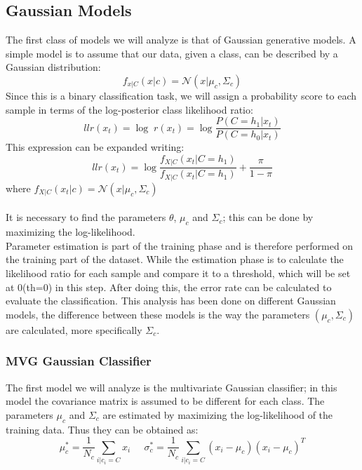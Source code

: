 \documentclass{article}
\begin{document}
\subsection{Gaussian Models}
The first class of models we will analyze is that of Gaussian generative models. A simple model is to assume that our data, given a class, can be described by a Gaussian distribution:
\begin{equation}
    f_{x|C}(x|c) = \mathcal{N}(x|\mu_c,\Sigma_c)
\end{equation}
Since this is a binary classification task, we will assign a probability score to each sample in terms of the log-posterior class likelihood ratio:
\begin{equation}
    llr(x_t) = \log \;r(x_t) = \log \frac{P(C=h_1|x_t)}{P(C=h_0|x_t)}
\end{equation}
This expression can be expanded writing:
\begin{equation}
    llr(x_t) = \log \frac{f_{X|C}(x_t|C=h_1)}{f_{X|C}(x_t|C=h_1)} + \frac{\pi }{1-\pi }
\end{equation}
where \( f_{X|C}(x_t|c)=\mathcal{N}(x|\mu_c,\Sigma_c)\)\\\\
It is necessary to find the parameters \(\theta \), \(\mu_c\) and \(\Sigma_c \); this can be done by maximizing the log-likelihood.\\ Parameter estimation is part of the training phase and is therefore performed on the training part of the dataset.
While the estimation phase is to calculate the likelihood ratio for each sample and compare it to a threshold, which will be set at 0(th=0) in this step. After doing this, the error rate can be calculated to evaluate the classification. 
This analysis has been done on different Gaussian models, the difference between these models is the way the parameters \((\mu_c ,\Sigma_c )\) are calculated, more specifically \(\Sigma_c\).
\subsubsection{MVG Gaussian Classifier}
The first model we will analyze is the multivariate Gaussian classifier; in this model the covariance matrix is assumed to be different for each class. The parameters \(\mu_c\) and \(\Sigma_c\) are estimated by maximizing the log-likelihood of the training data. Thus they can be obtained as:
\begin{equation}
    \mu_c^* = \frac{1}{N_c} \sum_{i|c_i=C} x_{i} \;\;\;\;\; \sigma_c^* = \frac{1}{N_c} \sum_{i|c_i=C} (x_{i} - \mu_c)(x_{i} - \mu_c)^T
\end{equation}
\end{document}
